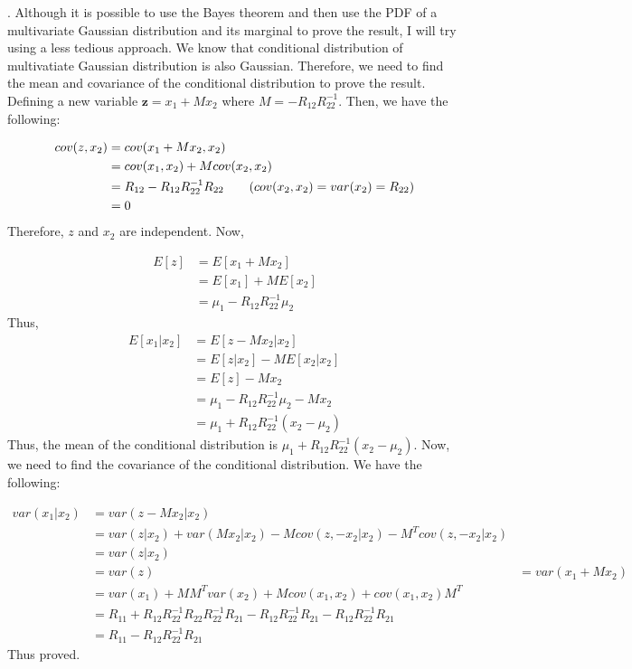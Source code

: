 \documentclass[a4paper,notitlepage,cs4size,cap,indent,oneside,12pt]{article}
\numberwithin{equation}{section}
\numberwithin{figure}{section}
\newcommand{\blue}{\color{blue}}
\newcommand{\vz}{\mathbf{z}}
\begin{document}
{\blue
{}.
Although it is possible to use the Bayes theorem and then use the PDF of a multivariate Gaussian distribution and its marginal to prove the result, I will try using a less tedious approach. We know that conditional distribution of multivatiate Gaussian distribution is also Gaussian. Therefore, we need to find the mean and covariance of the conditional distribution to prove the result. Defining a new variable $\vz = x_1 + Mx_2$ where $M = -R_{12}R^{-1}_{22}$. Then, we have the following:

\begin{align*}
  cov(z,x_2) &= cov(x_1 + Mx_2,x_2)\\
  &= cov(x_1,x_2) + Mcov(x_2,x_2)\\
  &= R_{12} - R_{12}R^{-1}_{22}R_{22} \tag{$cov(x_2, x_2) = var(x_2) = R_{22}$}\\
  &= 0
\end{align*}
Therefore, $z$ and $x_2$ are independent. Now,

\begin{align*}
  E[z] &= E[x_1 + Mx_2]\\
  &= E[x_1] + ME[x_2]\\
  &= \mu_1 - R_{12}R^{-1}_{22}\mu_2
\end{align*}
Thus,
\begin{align*}
  E[x_1|x_2] &= E[z - Mx_2|x_2]\\
  &= E[z|x_2] - ME[x_2|x_2]\\
  &= E[z] - Mx_2 \tag{Proved earlier that $z$ and $x_2$ are independent}\\
  &= \mu_1 - R_{12}R^{-1}_{22}\mu_2 - Mx_2\\
  &= \mu_1 + R_{12}R^{-1}_{22}(x_2 - \mu_2)
\end{align*}
Thus, the mean of the conditional distribution is $\mu_1 + R_{12}R^{-1}_{22}(x_2 - \mu_2)$. Now, we need to find the covariance of the conditional distribution. We have the following:

\begin{align*}
  var(x_1|x_2) &= var(z - Mx_2|x_2)\\
  &= var(z|x_2) + var(Mx_2|x_2) - Mcov(z,-x_2|x_2) - M^Tcov(z,-x_2|x_2)\\
  &= var(z|x_2)\\
  &= var(z)
  &= var(x_1 + Mx_2)\\
  &= var(x_1) + M M^T var(x_2) + Mcov(x_1,x_2) + cov(x_1,x_2)M^T\\
  &= R_{11} + R_{12}R^{-1}_{22}R_{22}R^{-1}_{22}R_{21} - R_{12}R^{-1}_{22}R_{21} - R_{12}R^{-1}_{22}R_{21}\\
  &= R_{11} - R_{12}R^{-1}_{22}R_{21}
\end{align*}
Thus proved. \\
}
\end{document}
